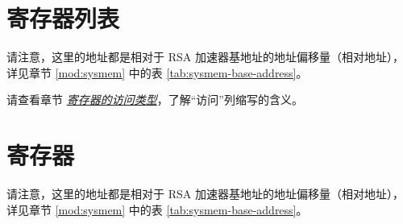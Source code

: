 \documentclass[main\_\_CN.tex]{subfiles}
\begin{document}
\section{ 寄存器列表 }\hypertarget{rsa-reg-summ}{}

请注意，这里的地址都是相对于 RSA 加速器基地址的地址偏移量（相对地址），详见章节 \ref{mod:sysmem} \textit{} 中的表 \ref{tab:sysmem-base-address}。

请查看章节 \hyperref[glossary-access-types]{\textit{寄存器的访问类型}}，了解“访问”列缩写的含义。




\section{ 寄存器 }
请注意，这里的地址都是相对于 RSA 加速器基地址的地址偏移量（相对地址），详见章节 \ref{mod:sysmem} \textit{} 中的表 \ref{tab:sysmem-base-address}。

\end{document}
